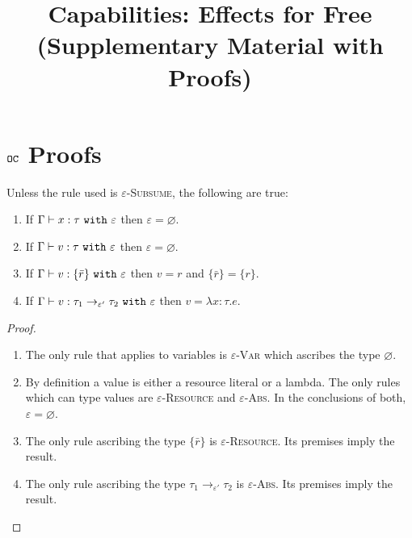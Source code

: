 \documentclass[acmsmall,review,anonymous]{acmart}\settopmatter{printfolios=true}
\begin{document}
\title{Capabilities: Effects for Free (Supplementary Material with Proofs)}


\maketitle


\section{$\mathtt{OC}$ Proofs}


\begin{lemma}
Unless the rule used is \textsc{$\varepsilon$-Subsume}, the following are true:
\begin{enumerate}
	\item If $\Gamma \vdash x: \tau~\mathtt{with}~ \varepsilon$ then $\varepsilon = \varnothing$.
	\item If $ \Gamma \vdash  v:  \tau~\mathtt{with}~ \varepsilon$ then $\varepsilon = \varnothing$.
	\item If $ \Gamma \vdash v: \{ \bar r \}~\mathtt{with}~ \varepsilon$ then $ v = r$ and $\{ \bar r \} = \{ r \}$.
	\item If $\Gamma \vdash v: \tau_1 \rightarrow_{\varepsilon'} \tau_2~\mathtt{with}~ \varepsilon$ then $v = \lambda x:\tau. e$.
\end{enumerate}
\end{lemma}


\begin{proof}
~
\begin{enumerate}
	\item The only rule that applies to variables is \textsc{$\varepsilon$-Var} which ascribes the type $\varnothing$.
	\item By definition a value is either a resource literal or a lambda. The only rules which can type values are \textsc{$\varepsilon$-Resource} and \textsc{$\varepsilon$-Abs}. In the conclusions of both, $\varepsilon = \varnothing$.
	\item The only rule ascribing the type $\{ \bar r \}$ is \textsc{$\varepsilon$-Resource}. Its premises imply the result.
	\item The only rule ascribing the type $\tau_1 \rightarrow_{\varepsilon'} \tau_2$ is \textsc{$\varepsilon$-Abs}. Its premises imply the result.
\end{enumerate}
\end{proof}


\hrulefill
\end{document}
